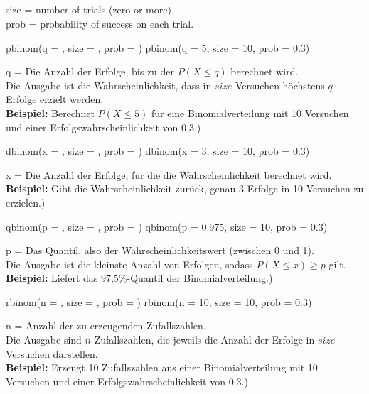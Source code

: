 \columnbreak
\subsection{}
size = number of trials (zero or more)
\\prob = probability of success on each trial.
\begin{rcode}{1}
pbinom(q = , size = , prob = )
pbinom(q = 5, size = 10, prob = 0.3)
\end{rcode}
q = Die Anzahl der Erfolge, bis zu der \(P(X \le q)\) berechnet wird.\\
Die Ausgabe ist die Wahrscheinlichkeit, dass in \(size\) Versuchen höchstens \(q\) Erfolge erzielt werden.\\
\textbf{Beispiel:} Berechnet \(P(X \le 5)\) für eine Binomialverteilung mit 10 Versuchen und einer Erfolgswahrscheinlichkeit von 0.3.)
\begin{rcode}{1}
dbinom(x = , size = , prob = )
dbinom(x = 3, size = 10, prob = 0.3)
\end{rcode}
x = Die Anzahl der Erfolge, für die die Wahrscheinlichkeit berechnet wird.\\
\textbf{Beispiel:} Gibt die Wahrscheinlichkeit zurück, genau 3 Erfolge in 10 Versuchen zu erzielen.)
\begin{rcode}{1}
qbinom(p = , size = , prob = )
qbinom(p = 0.975, size = 10, prob = 0.3)
\end{rcode}
p = Das Quantil, also der Wahrscheinlichkeitswert (zwischen 0 und 1).\\
Die Ausgabe ist die kleinste Anzahl von Erfolgen, sodass \(P(X \le x) \ge p\) gilt.\\
\textbf{Beispiel:} Liefert das 97,5\%-Quantil der Binomialverteilung.)
\begin{rcode}{1}
rbinom(n = , size = , prob = )
rbinom(n = 10, size = 10, prob = 0.3)
\end{rcode}
n = Anzahl der zu erzeugenden Zufallszahlen.\\
Die Ausgabe sind \(n\) Zufallszahlen, die jeweils die Anzahl der Erfolge in \(size\) Versuchen darstellen.\\
\textbf{Beispiel:} Erzeugt 10 Zufallszahlen aus einer Binomialverteilung mit 10 Versuchen und einer Erfolgswahrscheinlichkeit von 0.3.)
\newpage
